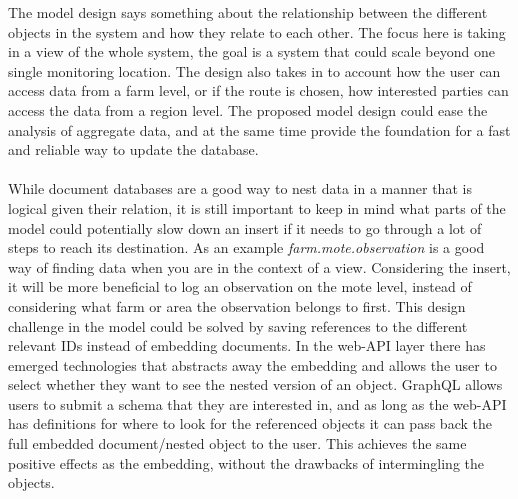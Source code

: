 \documentclass[]{uiophd}
\begin{document}
The model design says something about the relationship between the different objects in the system and how they relate to each other. The focus here is taking in a view of the whole system, the goal is a system that could scale beyond one single monitoring location. The design also takes in to account how the user can access data from a farm level, or if the route is chosen, how interested parties can access the data from a region level. The proposed model design could ease the analysis of aggregate data, and at the same time provide the foundation for a fast and reliable way to update the database.
\\\\
While document databases are a good way to nest data in a manner that is logical given their relation, it is still important to keep in mind what parts of the model could potentially slow down an insert if it needs to go through a lot of steps to reach its destination. As an example \textit{farm.mote.observation} is a good way of finding data when you are in the context of a view. Considering the insert, it will be more beneficial to log an observation on the mote level, instead of considering what farm or area the observation belongs to first. This design challenge in the model could be solved by saving references to the different relevant IDs instead of embedding documents. In the web-API layer there has emerged technologies that abstracts away the embedding and allows the user to select whether they want to see the nested version of an object. GraphQL allows users to submit a schema that they are interested in, and as long as the web-API has definitions for where to look for the referenced objects it can pass back the full embedded document/nested object to the user. This achieves the same positive effects as the embedding, without the drawbacks of intermingling the objects.
\end{document}

